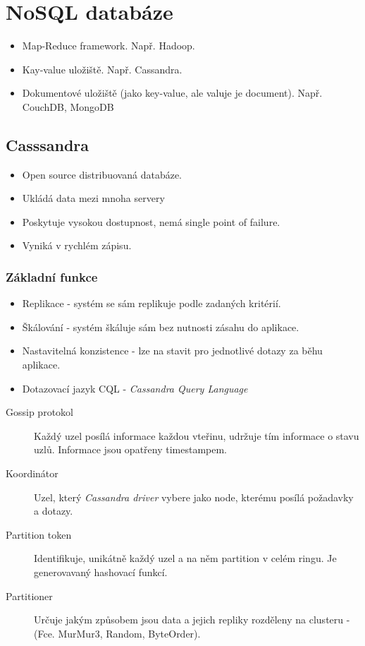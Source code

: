 \documentclass{article}
\begin{document}
\section{NoSQL databáze}
  \begin{itemize}
    \item Map-Reduce framework. Např. Hadoop.
    \item Kay-value uložiště. Např. Cassandra.
    \item Dokumentové uložiště (jako key-value, ale valuje je document). Např. CouchDB, MongoDB
  \end{itemize}

  \subsection{Casssandra}
    \begin{itemize}
      \item Open source distribuovaná databáze.
      \item Ukládá data mezi mnoha servery
      \item Poskytuje vysokou dostupnost, nemá single point of failure.
      \item Vyniká v rychlém zápisu.
    \end{itemize}

    \subsubsection{Základní funkce}
      \begin{itemize}
        \item Replikace - systém se sám replikuje podle zadaných kritérií.
        \item Škálování - systém škáluje sám bez nutnosti zásahu do aplikace.
        \item Nastavitelná konzistence  - lze na stavit pro jednotlivé dotazy za běhu aplikace.
        \item Dotazovací jazyk CQL - \emph{Cassandra Query Language}
      \end{itemize}

      \begin{description}
        \item[Gossip protokol] Každý uzel posílá informace každou vteřinu, udržuje tím informace o stavu uzlů. Informace jsou opatřeny timestampem.
        \item[Koordinátor] Uzel, který \emph{Cassandra driver} vybere jako node, kterému posílá požadavky a dotazy.
        \item[Partition token] Identifikuje, unikátně každý uzel a na něm partition v celém ringu. Je generovavaný hashovací funkcí.
        \item[Partitioner] Určuje jakým způsobem jsou data a jejich repliky rozděleny na clusteru - (Fce. MurMur3, Random, ByteOrder).
      \end{description}
\end{document}
